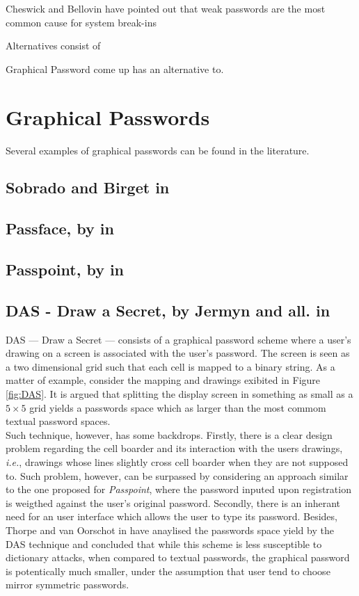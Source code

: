 \documentclass[11pt,a4paper]{article}
\theoremstyle{defn, nobreak=true}
\newcommand{\ie}{\emph{i.e.}}
\begin{document}
Cheswick and Bellovin have pointed out that weak passwords are the most common cause for system break-ins \cite{}

Alternatives consist of 

Graphical Password come up has an alternative to. 

\section{Graphical Passwords}

Several examples of graphical passwords can be found in the literature.

\subsection{Sobrado and Birget in \cite{shouldersurfing}} \label{subsec:das}

\subsection{Passface, by in \cite{passpoint}} \label{subsec:das}

\subsection{Passpoint, by in \cite{passpoint}} \label{subsec:das}

\subsection{DAS - Draw a Secret, by Jermyn and all. in \cite{passpoint}} \label{subsec:das}

DAS --- Draw a Secret --- consists of a graphical password scheme where a user's drawing on a screen is associated with the user's password. The screen is seen as a two dimensional grid such that each cell is mapped to a binary string. As a matter of example, consider the mapping and drawings exibited in Figure \ref{fig:DAS}. It is argued that splitting the display screen in something as small as a $5 {\times} 5$ grid yields a passwords space which as larger than the most commom textual password spaces. \\

Such technique, however, has some  backdrops. Firstly, there is a clear design problem regarding the cell boarder and its interaction with the users drawings, \ie, drawings whose lines slightly cross cell boarder when they are not supposed to. Such problem, however, can be surpassed by considering an approach similar to the one proposed for \textit{Passpoint}, where the password inputed upon registration is weigthed against the user's original password. Secondly, there is an inherant need for an user interface which allows the user to type its password. Besides, Thorpe and van Oorschot in \cite{spaceDAS} have anaylised the passwords space yield by the DAS technique and concluded that while this scheme is less susceptible to dictionary attacks, when compared to textual passwords, the graphical password is potentically much smaller, under the assumption that user tend to choose mirror symmetric passwords.
\end{document}
